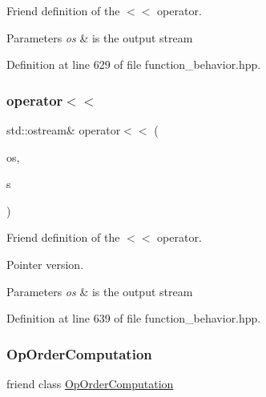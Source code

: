 Friend definition of the $<$$<$ operator. 


\begin{DoxyParams}{Parameters}
{\em os} & is the output stream \\
\hline
\end{DoxyParams}


Definition at line 629 of file function\+\_\+behavior.\+hpp.

\mbox{\label{classFunctionBehavior_a92d39fcd566b615ed2810ec59fc30a08}} 
\subsubsection{\texorpdfstring{operator$<$$<$}{operator<<}\hspace{0.1cm}{\footnotesize\ttfamily [2/2]}}
{\footnotesize\ttfamily std\+::ostream\& operator$<$$<$ (\begin{DoxyParamCaption}\item[{std\+::ostream \&}]{os,  }\item[{const \hyperlink{function__behavior_8hpp_affbc6a46ab86ddfabe31c10986d333dc}{Function\+Behavior\+Ref} \&}]{s }\end{DoxyParamCaption})\hspace{0.3cm}{\ttfamily [friend]}}



Friend definition of the $<$$<$ operator. 

Pointer version. 
\begin{DoxyParams}{Parameters}
{\em os} & is the output stream \\
\hline
\end{DoxyParams}


Definition at line 639 of file function\+\_\+behavior.\+hpp.

\mbox{\label{classFunctionBehavior_a747a030002d28122725936c3f71972b8}} 
\subsubsection{\texorpdfstring{Op\+Order\+Computation}{OpOrderComputation}}
{\footnotesize\ttfamily friend class \hyperlink{classOpOrderComputation}{Op\+Order\+Computation}\hspace{0.3cm}{\ttfamily [friend]}}



